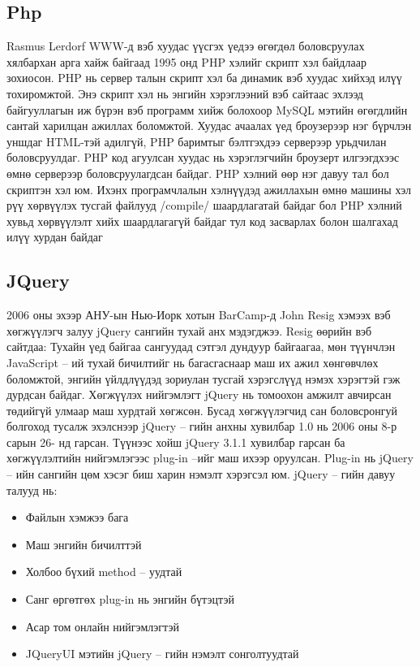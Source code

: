 \subsection{Php}
\hspace{1cm}Rasmus Lerdorf WWW-д вэб хуудас үүсгэх үедээ өгөгдөл боловсруулах хялбархан арга хайж байгаад 1995 онд PHP хэлийг скрипт хэл байдлаар зохиосон.
PHP нь сервер талын скрипт хэл ба динамик вэб хуудас хийхэд илүү тохиромжтой. Энэ скрипт хэл нь энгийн хэрэглээний вэб сайтаас эхлээд байгууллагын иж бүрэн вэб программ хийж болохоор MySQL мэтийн өгөгдлийн сантай харилцан ажиллах боломжтой.
Хуудас ачаалах үед броузерээр нэг бүрчлэн уншдаг HTML-тэй адилгүй, PHP баримтыг бэлтгэхдээ серверээр урьдчилан боловсруулдаг. PHP код агуулсан хуудас нь хэрэглэгчийн броузерт илгээгдхээс өмнө серверээр боловсруулагдсан байдаг.
PHP хэлний өөр нэг давуу тал бол скриптэн хэл юм. Ихэнх програмчлалын хэлнүүдэд ажиллахын өмнө машины хэл рүү хөрвүүлэх тусгай файлууд /compile/ шаардлагатай байдаг бол PHP хэлний хувьд хөрвүүлэлт хийх шаардлагагүй байдаг тул код засварлах болон шалгахад илүү хурдан байдаг

\subsection{JQuery}
\hspace{1cm}2006 оны эхээр АНУ-ын Нью-Иорк хотын BarCamp-д John Resig хэмээх вэб хөгжүүлэгч залуу jQuery сангийн тухай анх мэдэгджээ. Resig өөрийн вэб сайтдаа: Тухайн үед байгаа сангуудад сэтгэл дундуур байгаагаа, мөн түүнчлэн JavaScript – ий тухай бичилтийг нь багасгаснаар маш их ажил хөнгөвчлөх боломжтой, энгийн үйлдлүүдэд зориулан тусгай хэрэгслүүд нэмэх хэрэгтэй гэж дурдсан байдаг.
Хөгжүүлэх нийгэмлэгт jQuery нь томоохон амжилт авчирсан төдийгүй улмаар маш хурдтай хөгжсөн. Бусад хөгжүүлэгчид сан боловсронгуй болгоход тусалж эхэлснээр jQuery – гийн анхны хувилбар 1.0 нь 2006 оны 8-р сарын 26- нд гарсан.
Түүнээс хойш jQuery 3.1.1 хувилбар гарсан ба хөгжүүлэлтийн нийгэмлэгээс plug-in –ийг маш ихээр оруулсан. Plug-in нь jQuery – ийн сангийн цөм хэсэг биш харин нэмэлт хэрэгсэл юм. 
jQuery – гийн давуу талууд нь:
\begin{itemize}
\item Файлын хэмжээ бага
\item Маш энгийн бичилттэй
\item Холбоо бүхий method – уудтай
\item Санг өргөтгөх plug-in нь энгийн бүтэцтэй
\item Асар том онлайн нийгэмлэгтэй
\item JQueryUI мэтийн jQuery – гийн нэмэлт сонголтуудтай
\end{itemize}
